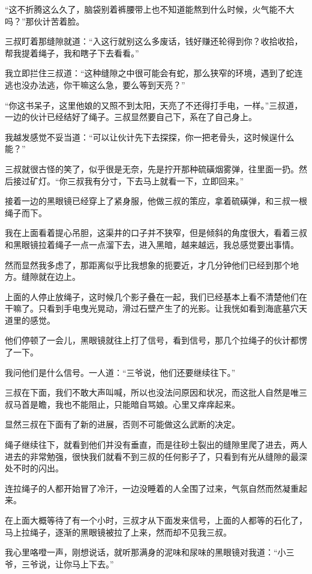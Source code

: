 “这不折腾这么久了，脑袋别着裤腰带上也不知道能熬到什么时候，火气能不大吗？”那伙计苦着脸。

三叔盯着那缝隙就道：“入这行就别这么多废话，钱好赚还轮得到你？收拾收拾，帮我提着绳子，我和瞎子下去看看。”

我立即拦住三叔道：“这种缝隙之中很可能会有蛇，那么狭窄的环境，遇到了蛇连逃也没办法逃，你干嘛这么急，要么等到天亮？”

“你这书呆子，这里他娘的又照不到太阳，天亮了不还得打手电，一样。”三叔道，一边的伙计已经结好了绳子。三叔显然要自己下，系在了自己身上。

我越发感觉不妥当道：“可以让伙计先下去探探，你一把老骨头，这时候逞什么能？”

三叔就很古怪的笑了，似乎很是无奈，先是拧开那种硫磺烟雾弹，往里面一扔。然后接过矿灯。“你三叔我有分寸，下去马上就看一下，立即回来。”

接着一边的黑眼镜已经穿上了紧身服，他做三叔的策应，拿着硫磺弹，和三叔一根绳子而下。

我在上面看着提心吊胆，这渠井的口子并不狭窄，但是倾斜的角度很大，看着三叔和黑眼镜拉着绳子一点一点溜下去，进入黑暗，越来越远，我总感觉要出事情。

然而显然我多虑了，那距离似乎比我想象的扼要近，才几分钟他们已经到那个地方。缝隙就在边上。

上面的人停止放绳子，这时候几个影子叠在一起，我们已经基本上看不清楚他们在干嘛了。只看到手电曳光晃动，滑过石壁产生了的光影。让我恍如看到海底墓穴天道里的感觉。

他们停顿了一会儿，黑眼镜就往上打了信号，看到信号，那几个拉绳子的伙计都愣了一下。

我问他们是什么信号。一人道：“三爷说，他们还要继续往下。”

三叔在下面，我们不敢大声叫喊，所以也没法问原因和状况，而这批人自然是唯三叔马首是瞻，我也不能阻止，只能暗自骂娘。心里又痒痒起来。

显然三叔在下面有了新的进展，否则不可能做这么武断的决定。

绳子继续往下，就看到他们并没有垂直，而是往砂土裂出的缝隙里爬了进去，两人进去的非常勉强，很快我们就看不到三叔的任何影子了，只看到有光从缝隙的最深处不时的闪出。

连拉绳子的人都开始冒了冷汗，一边没睡着的人全围了过来，气氛自然而然凝重起来。

在上面大概等待了有一个小时，三叔才从下面发来信号，上面的人都等的石化了，马上拉绳子，逐渐的黑眼镜被拉了上来，然而却不见我三叔。

我心里咯噔一声，刚想说话，就听那满身的泥味和尿味的黑眼镜对我道：“小三爷，三爷说，让你马上下去。”

